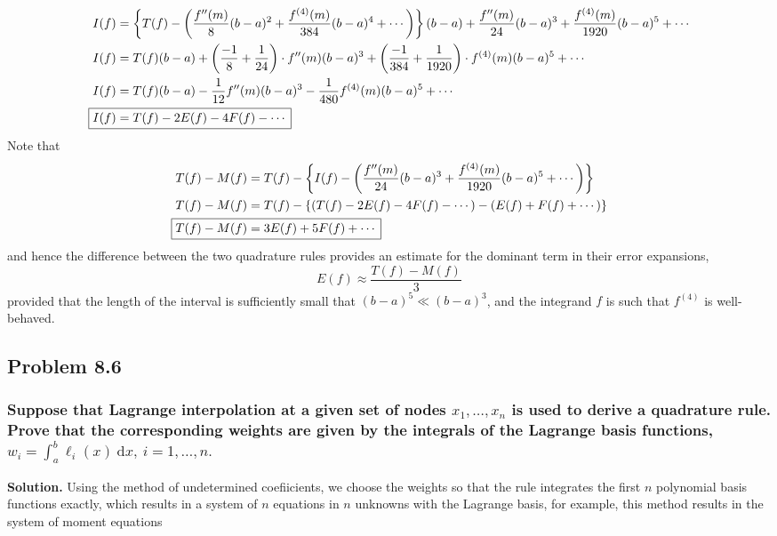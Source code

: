\begin{align*}
I(f) &= \left\lbrace T(f)-\left(\frac{f''(m)}{8}(b-a)^2 + \frac{f^{(4)}(m)}{384}(b-a)^4 + \cdots \right)\right\rbrace(b-a) +  \frac{f''(m)}{24}(b-a)^3 + \frac{f^{(4)}(m)}{1920}(b-a)^5 + \cdots\\
I(f) &= T(f)(b-a) + \left(\frac{-1}{8}+\frac{1}{24}\right)\cdot f''(m)(b-a)^3 + \left(\frac{-1}{384}+\frac{1}{1920}\right)\cdot f^{(4)}(m)(b-a)^5 + \cdots\\
I(f) &= T(f)(b-a) - \frac{1}{12}f''(m)(b-a)^3 - \frac{1}{480}f^{(4)}(m)(b-a)^5 + \cdots\\
\Aboxed{I(f) &= T(f) - 2E(f) - 4F(f) - \cdots}
\end{align*}
Note that
\begin{align*}
T(f) - M(f) &= T(f) - \left\lbrace I(f) - \left(\frac{f''(m)}{24}(b-a)^3 + \frac{f^{(4)}(m)}{1920}(b-a)^5+ \cdots\right)\right\rbrace\\
T(f) - M(f) &= T(f) - \left\lbrace \left(T(f)-2E(f)-4F(f)-\cdots\right) - \left(E(f) + F(f) + \cdots \right)\right\rbrace\\
\Aboxed{T(f) - M(f) &= 3E(f) + 5F(f) + \cdots}
\end{align*}
and hence the difference between the two quadrature rules provides an estimate for the dominant term in their error expansions,
\begin{equation}
\boxed{E(f) \approx \frac{T(f)-M(f)}{3}}
\end{equation}
provided that the length of the interval is sufficiently small that $(b-a)^5 \ll (b-a)^3$, and the integrand $f$ is such that $f^{(4)}$ is well-behaved. \qedsymbol

\subsection{Problem 8.6}
\subsubsection*{Suppose that Lagrange interpolation at a given set of nodes $x_1,\ldots,x_n$ is used to derive a quadrature rule. Prove that the corresponding weights are given by the integrals of the Lagrange basis functions, $w_i = \int_{a}^{b}\ell_i(x)\:\mathrm{d}x, \:i = 1,\ldots, n.$}

\textbf{Solution.} Using the method of undetermined coefiicients, we choose the weights so that the rule integrates the first $n$ polynomial basis functions exactly, which results in a system of $n$ equations in $n$ unknowns with the Lagrange basis, for example, this method results in the system of moment equations

